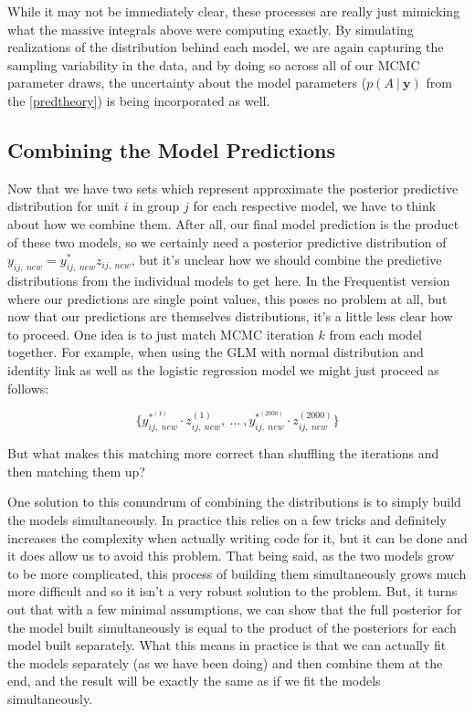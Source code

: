 \documentclass[12pt,twoside]{reedthesis}
\begin{document}
While it may not be immediately clear, these processes are really just mimicking what the massive integrals above were computing exactly. By simulating realizations of the distribution behind each model, we are again capturing the sampling variability in the data, and by doing so across all of our MCMC parameter draws, the uncertainty about the model parameters (\(p(A \ | \ \mathbf{y} )\) from the \ref{predtheory}) is being incorporated as well.

\hypertarget{comb}{%
\subsection{Combining the Model Predictions}\label{comb}}

Now that we have two sets which represent approximate the posterior predictive distribution for unit \(i\) in group \(j\) for each respective model, we have to think about how we combine them. After all, our final model prediction is the product of these two models, so we certainly need a posterior predictive distribution of \(y_{ij, \ new} = y_{ij, \ new}^*z_{ij, \ new}\), but it's unclear how we should combine the predictive distributions from the individual models to get here. In the Frequentist version where our predictions are single point values, this poses no problem at all, but now that our predictions are themselves distributions, it's a little less clear how to proceed. One idea is to just match MCMC iteration \(k\) from each model together. For example, when using the GLM with normal distribution and identity link as well as the logistic regression model we might just proceed as follows:

\[
\Big\{y_{ij , \ new}^{*^{(1)}}\cdot z^{(1)}_{ij, \ new}, \  ... \ , y_{ij, \ new}^{*^{(2000)}}\cdot z^{(2000)}_{ij, \ new}\Big\}
\]

But what makes this matching more correct than shuffling the iterations and then matching them up?

One solution to this conundrum of combining the distributions is to simply build the models simultaneously. In practice this relies on a few tricks and definitely increases the complexity when actually writing code for it, but it can be done and it does allow us to avoid this problem. That being said, as the two models grow to be more complicated, this process of building them simultaneously grows much more difficult and so it isn't a very robust solution to the problem. But, it turns out that with a few minimal assumptions, we can show that the full posterior for the model built simultaneously is equal to the product of the posteriors for each model built separately. What this means in practice is that we can actually fit the models separately (as we have been doing) and then combine them at the end, and the result will be exactly the same as if we fit the models simultaneously.
\end{document}
